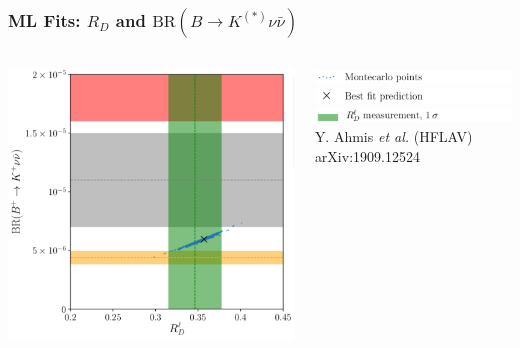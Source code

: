\documentclass[mathserif, 10pt, dvipsnames]{beamer}
\newcommand\colorcite[1]{{\scriptsize\color{unizarblue}#1}}
\begin{document}
\begin{frame}\frametitle{ML Fits: $R_D$ and $\mathrm{BR}(B\to K^{(*)}\nu\bar{\nu})$}

    \begin{center}
\begin{columns}[onlytextwidth]
    \begin{column}{0.55\textwidth}
        \includegraphics[width=\textwidth]{figures/RD_BKnunu_plot.pdf}
    \end{column}
    \begin{column}{0.45\textwidth}
        \includegraphics[width=\textwidth]{figures/RD_BKnunu_leg1.pdf}\\[2pt]
        \includegraphics[width=\textwidth]{figures/RD_BKnunu_leg2.pdf}\\[2pt]
        \includegraphics[width=\textwidth]{figures/RD_BKnunu_leg3.pdf}\\[-6pt]
        \colorcite{Y. Ahmis \textit{et al.} (HFLAV) arXiv:1909.12524}\\[4pt]

\end{column}
\end{columns}
\end{center}
\end{frame}
\end{document}
